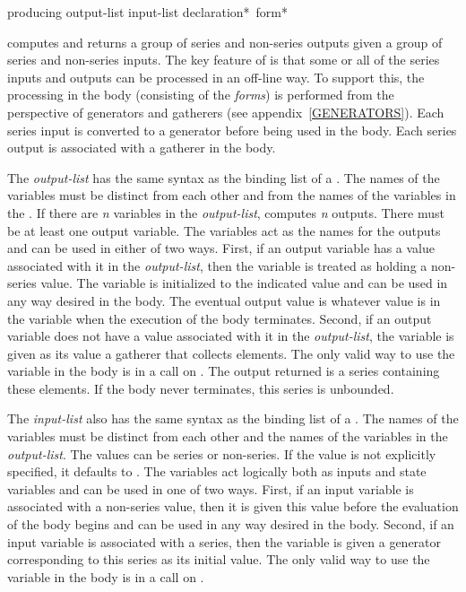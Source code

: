 \begin{defmac}
producing output-list input-list {declaration}* {\,form}*

 computes and returns a group of series and non-series
outputs given a group of series and non-series inputs.  The key feature of
 is that some or all of the series inputs and outputs can be
processed in an off-line way.  To support this, the processing in the
body (consisting of the \emph{forms}) is performed from the perspective
of generators and gatherers (see
appendix~\ref{GENERATORS}).  Each series input is converted to a generator
before being used in the body.  Each series output is associated with
a gatherer in the body.

The \emph{output-list} has the same syntax as the binding list of a 
.  The names of the variables must be distinct from each other and
from the names of the variables in the .  If there are \emph{n}
variables in the \emph{output-list},  computes \emph{n}
outputs.  There must be at least one output variable.  The variables act as
the names for the outputs and can be used in either of two ways.  First, if
an output variable has a value associated with it in the \emph{output-list},
then the variable is treated as holding a non-series value.  The variable
is initialized to the indicated value and can be used in any way desired in
the body. The eventual output value is whatever value is in the variable
when the execution of the body terminates.  Second, if an output variable
does not have a value associated with it in the \emph{output-list}, the
variable is given as its value a gatherer that collects elements.  The only
valid way to use the variable in the body is in a call on .
The output returned is a series containing these elements.  If the body
never terminates, this series is unbounded.

The \emph{input-list} also has the same syntax as the binding list of a 
.   The names of the variables must be distinct from each other and
the names of the variables in the \emph{output-list}.  The values can be
series or non-series.  If the value is not explicitly specified, it
defaults to .  The variables act logically both as inputs and
state variables and can be used in one of two ways.  First, if an input
variable is associated with a non-series value, then it is given this value
before the evaluation of the body begins and can be used in any way desired
in the body.   Second, if an input variable is associated with a series,
then the variable is given a generator corresponding to this series as its
initial value.  The only valid way to use the variable in the body is in a
call on .


\end{defmac}
